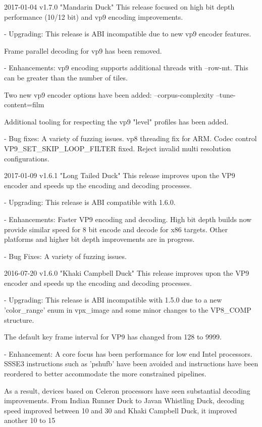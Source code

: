
\begin{DoxyVerbInclude}
2017-01-04 v1.7.0 "Mandarin Duck"
  This release focused on high bit depth performance (10/12 bit) and vp9
  encoding improvements.

  - Upgrading:
    This release is ABI incompatible due to new vp9 encoder features.

    Frame parallel decoding for vp9 has been removed.

  - Enhancements:
    vp9 encoding supports additional threads with --row-mt. This can be greater
    than the number of tiles.

    Two new vp9 encoder options have been added:
      --corpus-complexity
      --tune-content=film

    Additional tooling for respecting the vp9 "level" profiles has been added.

  - Bug fixes:
    A variety of fuzzing issues.
    vp8 threading fix for ARM.
    Codec control VP9_SET_SKIP_LOOP_FILTER fixed.
    Reject invalid multi resolution configurations.

2017-01-09 v1.6.1 "Long Tailed Duck"
  This release improves upon the VP9 encoder and speeds up the encoding and
  decoding processes.

  - Upgrading:
    This release is ABI compatible with 1.6.0.

  - Enhancements:
    Faster VP9 encoding and decoding.
    High bit depth builds now provide similar speed for 8 bit encode and decode
    for x86 targets. Other platforms and higher bit depth improvements are in
    progress.

  - Bug Fixes:
    A variety of fuzzing issues.

2016-07-20 v1.6.0 "Khaki Campbell Duck"
  This release improves upon the VP9 encoder and speeds up the encoding and
  decoding processes.

  - Upgrading:
    This release is ABI incompatible with 1.5.0 due to a new 'color_range' enum
    in vpx_image and some minor changes to the VP8_COMP structure.

    The default key frame interval for VP9 has changed from 128 to 9999.

  - Enhancement:
    A core focus has been performance for low end Intel processors. SSSE3
    instructions such as 'pshufb' have been avoided and instructions have been
    reordered to better accommodate the more constrained pipelines.

    As a result, devices based on Celeron processors have seen substantial
    decoding improvements. From Indian Runner Duck to Javan Whistling Duck,
    decoding speed improved between 10 and 30%
    and Khaki Campbell Duck, it improved another 10 to 15%


\end{DoxyVerbInclude}
